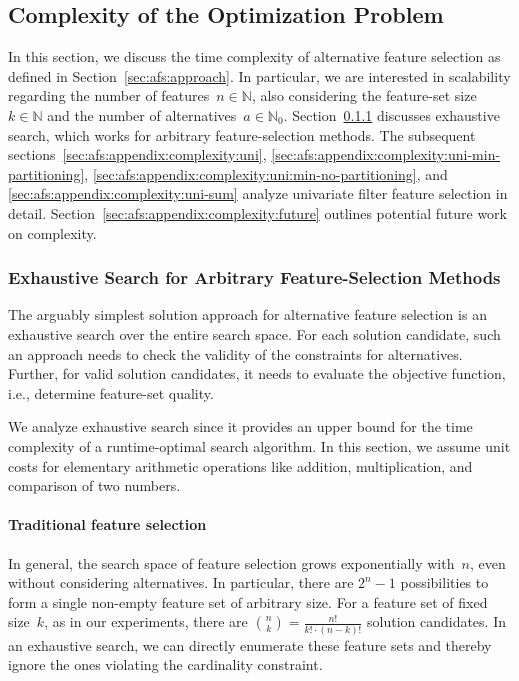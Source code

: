 \documentclass{article}
\theoremstyle{definition}
\begin{document}
\subsection{Complexity of the Optimization Problem}
\label{sec:afs:appendix:complexity}

In this section, we discuss the time complexity of alternative feature selection as defined in Section~\ref{sec:afs:approach}.
In particular, we are interested in scalability regarding the number of features~$n \in \mathbb{N}$, also considering the feature-set size~$k \in \mathbb{N}$ and the number of alternatives~$a \in \mathbb{N}_0$.
Section~\ref{sec:afs:appendix:complexity:exhaustive} discusses exhaustive search, which works for arbitrary feature-selection methods.
The subsequent sections~\ref{sec:afs:appendix:complexity:uni}, \ref{sec:afs:appendix:complexity:uni-min-partitioning}, \ref{sec:afs:appendix:complexity:uni:min-no-partitioning}, and \ref{sec:afs:appendix:complexity:uni-sum} analyze univariate filter feature selection in detail.
Section~\ref{sec:afs:appendix:complexity:future} outlines potential future work on complexity.

\subsubsection{Exhaustive Search for Arbitrary Feature-Selection Methods}
\label{sec:afs:appendix:complexity:exhaustive}

The arguably simplest solution approach for alternative feature selection is an exhaustive search over the entire search space.
For each solution candidate, such an approach needs to check the validity of the constraints for alternatives.
Further, for valid solution candidates, it needs to evaluate the objective function, i.e., determine feature-set quality.

We analyze exhaustive search since it provides an upper bound for the time complexity of a runtime-optimal search algorithm.
In this section, we assume unit costs for elementary arithmetic operations like addition, multiplication, and comparison of two numbers.

\paragraph{Traditional feature selection}

In general, the search space of feature selection grows exponentially with~$n$, even without considering alternatives.
In particular, there are $2^n - 1$ possibilities to form a single non-empty feature set of arbitrary size.
For a feature set of fixed size~$k$, as in our experiments, there are $\binom{n}{k} = \frac{n!}{k! \cdot (n-k)!}$ solution candidates.
In an exhaustive search, we can directly enumerate these feature sets and thereby ignore the ones violating the cardinality constraint.
\end{document}
